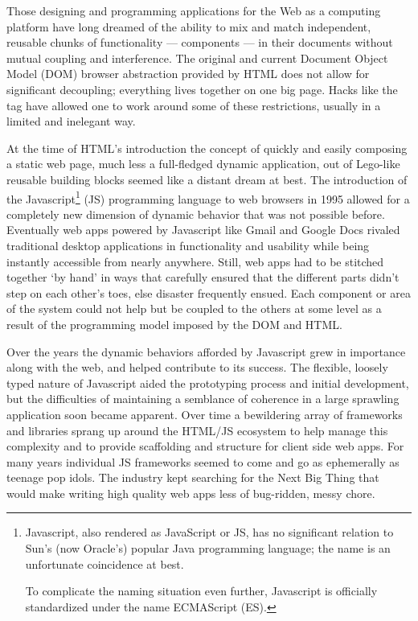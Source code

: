 Those designing and programming applications for the Web as a computing platform have long dreamed of the ability to mix and match independent, reusable chunks of functionality --- components --- in their documents without mutual coupling and interference. 
The original and current Document Object Model (DOM)
browser abstraction provided by HTML does not allow for significant decoupling; 
everything lives together on one big page. Hacks like the 
tag have allowed one to work around some of these restrictions, 
usually in a limited and inelegant way.

At the time of HTML's introduction the concept of quickly and easily composing a static web page, 
much less a full-fledged dynamic application, 
out of Lego-like reusable building blocks seemed like a distant dream at best. 
The introduction of the 
Javascript\footnote{Javascript, also rendered as JavaScript or JS, 
has no significant relation to Sun's (now Oracle's) popular Java programming language;
the name is an unfortunate coincidence at best.

To complicate the naming situation even further, Javascript is officially standardized under the name ECMAScript (ES).}
(JS) programming language to web browsers in 1995 allowed for a completely new dimension of dynamic behavior that was not possible before.
Eventually web apps powered by Javascript like Gmail and Google Docs rivaled traditional desktop applications in functionality and usability while being instantly accessible from nearly anywhere.
Still, web apps had to be stitched together `by hand' in ways that carefully ensured that the different parts didn't step on each other's toes, else disaster frequently ensued. 
Each component or area of the system could not help but be coupled to the others at some level as a result of the programming model imposed by the DOM and HTML.

Over the years the dynamic behaviors afforded by Javascript grew in importance along with the web, and helped contribute to its success. 
The flexible, loosely typed nature of Javascript aided the prototyping process and initial development,
but the difficulties of maintaining a semblance of coherence in a large sprawling application soon became apparent.
Over time a bewildering array of frameworks and libraries sprang up around the HTML/JS ecosystem to help manage this complexity and to provide scaffolding and structure for client side web apps.
For many years individual JS frameworks seemed to come and go as ephemerally as teenage pop idols. 
The industry kept searching for the Next Big Thing that would make writing high quality web apps less of bug-ridden, messy chore. 

